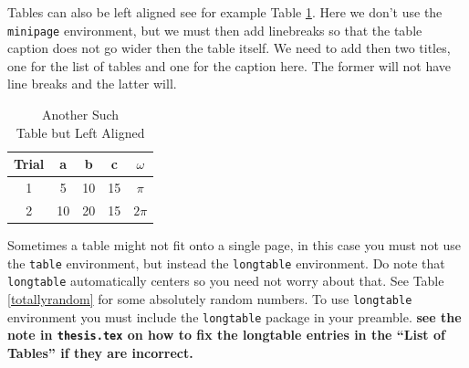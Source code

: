 Tables can also be left aligned see for example Table \ref{ltab}.
Here we don't use the \texttt{minipage} environment, but we must then
add linebreaks so that the table caption does not go wider then the
table itself.  We need to add then two titles, one for the list of
tables and one for the caption here.  The former will not have line
breaks and the latter will.
% 
\begin{table}[htb]
  \caption[
  Another Such Table but Left Aligned]{
    Another Such\\Table but Left Aligned\label{ltab}}
  \begin{tabular}{|c||c|c|c|c||}    \hline
    Trial &	a  &  b & c & $\omega$ \\ \hline \hline
    1 & 5 & 10  & 15 & $\pi$ \\ \hline
    2 & 10 & 20  & 15 & $2\pi$ \\ \hline
  \end{tabular}
\end{table}

Sometimes a table might not fit onto a single page, in this case you
must not use the \texttt{table} environment, but instead the
\texttt{longtable} environment. Do note that \texttt{longtable}
automatically centers so you need not worry about that.  See Table
\ref{totallyrandom} for some absolutely random numbers.  To use
\texttt{longtable} environment you must include the \texttt{longtable}
package in your preamble. \textbf{see the note in \texttt{thesis.tex}
  on how to fix the longtable entries in the ``List of Tables'' if
  they are incorrect.}


